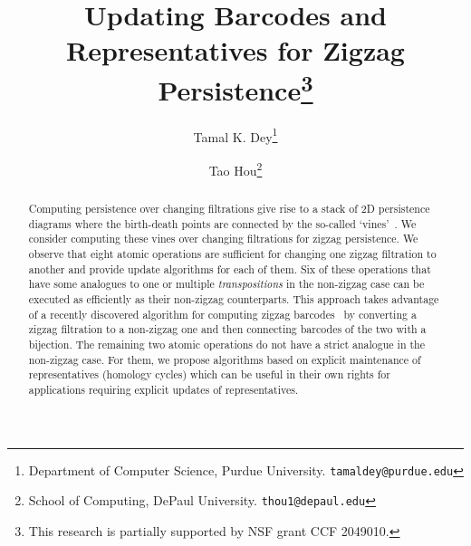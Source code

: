 \documentclass[letterpaper,11pt]{article}
\theoremstyle{mythmstyle}
\theoremstyle{mydefstyle}
\theoremstyle{plain}
\theoremstyle{definition}
\newcommand{\<}[1]{\langle #1\rangle}
\begin{document}
\title{Updating Barcodes and Representatives for Zigzag Persistence\thanks{This research is partially supported by NSF grant CCF 2049010.}}


\author{Tamal K. Dey\thanks{Department of Computer Science, Purdue University. \texttt{tamaldey@purdue.edu}}
\and Tao Hou\thanks{School of Computing, DePaul University. \texttt{thou1@depaul.edu}}
}

\date{}

\maketitle
\thispagestyle{empty}

\begin{abstract}
Computing persistence over changing filtrations give rise to a
stack of 2D persistence diagrams where the birth-death points 
are connected by the so-called `vines'~\cite{cohen2006vines}. We consider
computing these vines over changing filtrations for zigzag persistence.
We observe that eight atomic operations are sufficient for changing
one zigzag filtration to another and provide update
algorithms for each of them. Six of these operations that have
some 
analogues to one or multiple \emph{transpositions} in the non-zigzag case can be executed as efficiently
as their non-zigzag counterparts. This approach
takes advantage of a recently discovered algorithm for
computing zigzag barcodes~\cite{dey2022fast} by converting a zigzag filtration to a
non-zigzag one and then connecting barcodes of the two with a bijection. 
The remaining two atomic operations do not have a strict analogue in the non-zigzag case.
For them, we propose algorithms based on explicit maintenance of representatives (homology cycles) which can be useful in their own rights for applications requiring explicit updates of representatives.

\end{abstract}

\newpage
\setcounter{page}{1}
\end{document}
